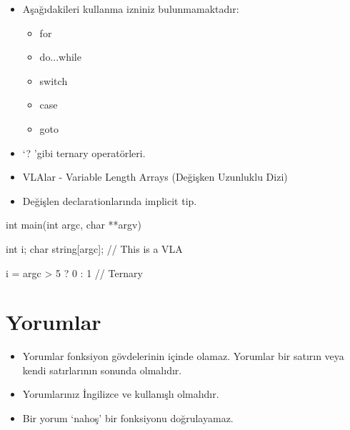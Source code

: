 \documentclass{42-en}
\begin{document}
        \begin{itemize}

            \item Aşağıdakileri kullanma izniniz bulunmamaktadır:

                \begin{itemize}

                    \item for
                    \item do...while
                    \item switch
                    \item case
                    \item goto

                \end{itemize}

            \item ‘? ’gibi ternary operatörleri.

            \item VLAlar - Variable Length Arrays (Değişken Uzunluklu Dizi)

            \item Değişlen declarationlarında implicit tip.

        \end{itemize}
        \begin{42ccode}
    int main(int argc, char **argv)
    {
        int     i;
        char    string[argc]; // This is a VLA

        i = argc > 5 ? 0 : 1 // Ternary
    }
        \end{42ccode}
        \newpage

    \section{Yorumlar}

        \begin{itemize}

            \item Yorumlar fonksiyon gövdelerinin içinde olamaz. Yorumlar bir satırın veya kendi satırlarının sonunda olmalıdır.

            \item Yorumlarınız İngilizce ve kullanışlı olmalıdır.

            \item Bir yorum ‘nahoş’ bir fonksiyonu doğrulayamaz.

        \end{itemize}
        \newpage
\end{document}
